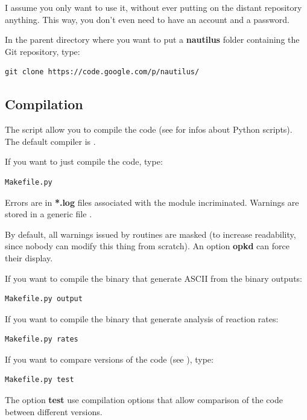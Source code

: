 \documentclass[english,a4paper,twoside]{article}
\begin{document}
I assume you only want to use it, without ever putting on the distant repository anything. This way, you don't even need to have an account and a password. 

In the parent directory where you want to put a \textbf{nautilus} folder containing the Git repository, type:
\begin{verbatim}
git clone https://code.google.com/p/nautilus/
\end{verbatim}

\subsection{Compilation}
The script  allow you to compile the code (see  for infos about Python scripts). The default compiler is . 

If you want to just compile the code, type:
\begin{verbatim}
Makefile.py
\end{verbatim}

\begin{remarque}
Errors are in \textbf{*.log} files associated with the module incriminated. Warnings are stored in a generic file .
\end{remarque}

\begin{attention}
By default, all warnings issued by  routines are masked (to increase readability, since nobody can modify this thing from scratch). An option \textbf{opkd} can force their display.
\end{attention}

If you want to compile the binary  that generate ASCII from the binary outputs:
\begin{verbatim}
Makefile.py output
\end{verbatim}

If you want to compile the binary  that generate analysis of reaction rates:
\begin{verbatim}
Makefile.py rates
\end{verbatim}

If you want to compare versions of the code (see ), type:
\begin{verbatim}
Makefile.py test
\end{verbatim}
The option \textbf{test} use compilation options that allow comparison of the code between different versions. 
\end{document}
